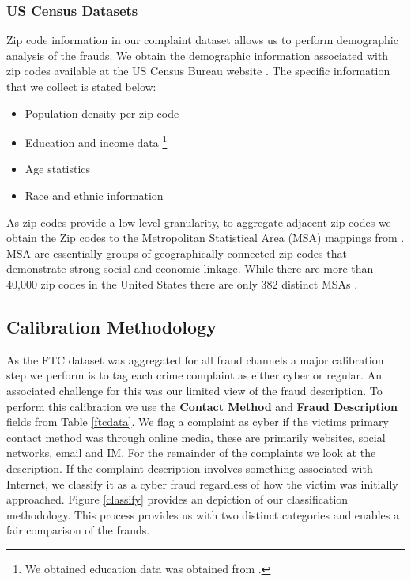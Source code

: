 \documentclass[conference]{IEEEtran}
\begin{document}
\subsubsection{US Census Datasets}
Zip code information in our complaint dataset allows us to perform demographic analysis of the frauds. We obtain the demographic information associated with zip codes available at the US Census Bureau website \cite{uscensus}. The specific information that we collect is stated below:

\begin{itemize}
\vspace{8pt}
  \item Population density per zip code
  \item Education and income data \footnote{We obtained education data was obtained from \cite{zipatlas}.}
  \item Age statistics
  \item Race and ethnic information
  \vspace{8pt}
\end{itemize}

As zip codes provide a low level granularity, to aggregate adjacent zip codes we obtain the Zip codes to the Metropolitan Statistical Area (MSA) mappings from \cite{uslaborstats}. MSA are essentially groups of geographically connected zip codes that demonstrate strong social and economic linkage. While there are more than 40,000 zip codes in the United States there are only 382 distinct MSAs \cite{uscensus}.

\subsection{Calibration Methodology}

As the FTC dataset was aggregated for all fraud channels a major calibration step we perform is to tag each crime complaint as either cyber or regular. An associated challenge for this was our limited view of the fraud description. To perform this calibration we use the \textbf{Contact Method} and \textbf{Fraud Description} fields from Table \ref{ftcdata}. We flag a complaint as cyber if the victims primary contact method was through online media, these are primarily websites, social networks, email and IM. For the remainder of the complaints we look at the description. If the complaint description involves something associated with Internet, we classify it as a cyber fraud regardless of how the victim was initially approached. Figure \ref{classify} provides an depiction of our classification methodology. This process  provides us with two distinct categories  and enables a fair comparison of the frauds. 
     
\end{document}
